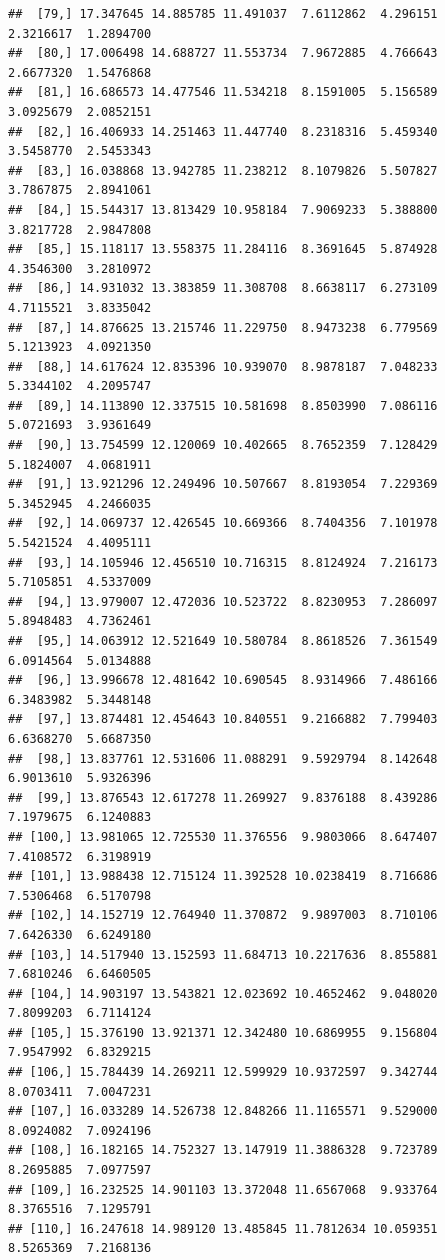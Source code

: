\documentclass{article}\usepackage[]{graphicx}\usepackage[]{color}
\makeatletter
\newenvironment{kframe}{%
 \def\at@end@of@kframe{}%
 \ifinner\ifhmode%
  \def\at@end@of@kframe{\end{minipage}}%
  \begin{minipage}{\columnwidth}%
 \fi\fi%
 \def\FrameCommand##1{\hskip\@totalleftmargin \hskip-\fboxsep
 \colorbox{shadecolor}{##1}\hskip-\fboxsep
     \hskip-\linewidth \hskip-\@totalleftmargin \hskip\columnwidth}%
 \MakeFramed {\advance\hsize-\width
   \@totalleftmargin\z@ \linewidth\hsize
   \@setminipage}}%
 {\par\unskip\endMakeFramed%
 \at@end@of@kframe}
\newenvironment{knitrout}{}{} %
\makeatother
\begin{document}
\begin{knitrout}
\begin{kframe}
\begin{verbatim}
##  [79,] 17.347645 14.885785 11.491037  7.6112862  4.296151  2.3216617  1.2894700
##  [80,] 17.006498 14.688727 11.553734  7.9672885  4.766643  2.6677320  1.5476868
##  [81,] 16.686573 14.477546 11.534218  8.1591005  5.156589  3.0925679  2.0852151
##  [82,] 16.406933 14.251463 11.447740  8.2318316  5.459340  3.5458770  2.5453343
##  [83,] 16.038868 13.942785 11.238212  8.1079826  5.507827  3.7867875  2.8941061
##  [84,] 15.544317 13.813429 10.958184  7.9069233  5.388800  3.8217728  2.9847808
##  [85,] 15.118117 13.558375 11.284116  8.3691645  5.874928  4.3546300  3.2810972
##  [86,] 14.931032 13.383859 11.308708  8.6638117  6.273109  4.7115521  3.8335042
##  [87,] 14.876625 13.215746 11.229750  8.9473238  6.779569  5.1213923  4.0921350
##  [88,] 14.617624 12.835396 10.939070  8.9878187  7.048233  5.3344102  4.2095747
##  [89,] 14.113890 12.337515 10.581698  8.8503990  7.086116  5.0721693  3.9361649
##  [90,] 13.754599 12.120069 10.402665  8.7652359  7.128429  5.1824007  4.0681911
##  [91,] 13.921296 12.249496 10.507667  8.8193054  7.229369  5.3452945  4.2466035
##  [92,] 14.069737 12.426545 10.669366  8.7404356  7.101978  5.5421524  4.4095111
##  [93,] 14.105946 12.456510 10.716315  8.8124924  7.216173  5.7105851  4.5337009
##  [94,] 13.979007 12.472036 10.523722  8.8230953  7.286097  5.8948483  4.7362461
##  [95,] 14.063912 12.521649 10.580784  8.8618526  7.361549  6.0914564  5.0134888
##  [96,] 13.996678 12.481642 10.690545  8.9314966  7.486166  6.3483982  5.3448148
##  [97,] 13.874481 12.454643 10.840551  9.2166882  7.799403  6.6368270  5.6687350
##  [98,] 13.837761 12.531606 11.088291  9.5929794  8.142648  6.9013610  5.9326396
##  [99,] 13.876543 12.617278 11.269927  9.8376188  8.439286  7.1979675  6.1240883
## [100,] 13.981065 12.725530 11.376556  9.9803066  8.647407  7.4108572  6.3198919
## [101,] 13.988438 12.715124 11.392528 10.0238419  8.716686  7.5306468  6.5170798
## [102,] 14.152719 12.764940 11.370872  9.9897003  8.710106  7.6426330  6.6249180
## [103,] 14.517940 13.152593 11.684713 10.2217636  8.855881  7.6810246  6.6460505
## [104,] 14.903197 13.543821 12.023692 10.4652462  9.048020  7.8099203  6.7114124
## [105,] 15.376190 13.921371 12.342480 10.6869955  9.156804  7.9547992  6.8329215
## [106,] 15.784439 14.269211 12.599929 10.9372597  9.342744  8.0703411  7.0047231
## [107,] 16.033289 14.526738 12.848266 11.1165571  9.529000  8.0924082  7.0924196
## [108,] 16.182165 14.752327 13.147919 11.3886328  9.723789  8.2695885  7.0977597
## [109,] 16.232525 14.901103 13.372048 11.6567068  9.933764  8.3765516  7.1295791
## [110,] 16.247618 14.989120 13.485845 11.7812634 10.059351  8.5265369  7.2168136

\end{verbatim}
\end{kframe}
\end{knitrout}
\end{document}
